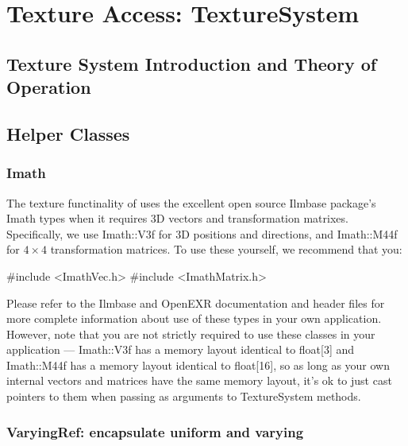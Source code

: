 \chapter{Texture Access: {\cf TextureSystem}}
\label{chap:texturesystem}

\def\TextureSystem{{\kw TextureSystem}\xspace}
\def\TextureOptions{{\kw TextureOptions}\xspace}


\section{Texture System Introduction and Theory of Operation}
\label{sec:texturesys:intro}

\section{Helper Classes}
\label{sec:texturesys:helperclasses}

\subsection{Imath}

The texture functinality of \product uses the excellent open source
{\cf Ilmbase} package's {\cf Imath} types when it requires 3D vectors
and transformation matrixes.  Specifically, we use {\cf Imath::V3f}
for 3D positions and directions, and {\cf Imath::M44f} for $4 \times 4$
transformation matrices.  To use these yourself, we recommend that you:

\begin{code}
    #include <ImathVec.h>
    #include <ImathMatrix.h>
\end{code}

Please refer to the {\cf Ilmbase} and {\cf OpenEXR}
documentation and header files for more complete information about
use of these types in your own application.  However, note that you
are not strictly required to use these classes in your application ---
{\cf Imath::V3f} has a memory layout identical to {\cf float[3]}
and {\cf Imath::M44f} has a memory layout identical to {\cf float[16]},
so as long as your own internal vectors and matrices have the same
memory layout, it's ok to just cast pointers to them when passing
as arguments to \TextureSystem methods.

\subsection{{\cf VaryingRef}: encapsulate uniform and varying}

